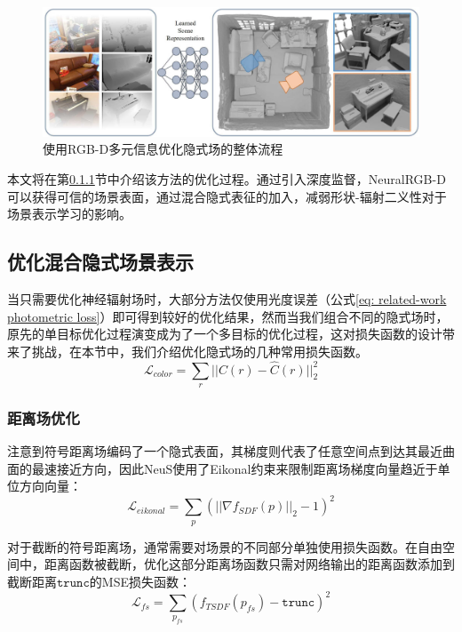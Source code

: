 \begin{figure}[htbp]
    \centering
    \includegraphics[width=\textwidth]{undergraduate-thesis/images/neural-rgbd problem.png}
    \caption{使用RGB-D多元信息优化隐式场的整体流程}
    \label{fig:related-work neural-rgbd formulation}
\end{figure}

本文将在第\ref{sec: related-work SDF optimization}节中介绍该方法的优化过程。通过引入深度监督，NeuralRGB-D可以获得可信的场景表面，通过混合隐式表征的加入，减弱形状-辐射二义性对于场景表示学习的影响。

\subsection{优化混合隐式场景表示}
当只需要优化神经辐射场时，大部分方法仅使用光度误差（公式\ref{eq: related-work photometric loss}）即可得到较好的优化结果，然而当我们组合不同的隐式场时，原先的单目标优化过程演变成为了一个多目标的优化过程，这对损失函数的设计带来了挑战，在本节中，我们介绍优化隐式场的几种常用损失函数。
\begin{equation}
    \mathcal{L}_{color} = \sum_r||C(r)-\hat{C}(r)||_2^2
    \label{eq: related-work photometric loss}
\end{equation}

\subsubsection{距离场优化}
\label{sec: related-work SDF optimization}
注意到符号距离场编码了一个隐式表面，其梯度则代表了任意空间点到达其最近曲面的最速接近方向，因此NeuS\cite{wang_neus_2021}使用了Eikonal约束来限制距离场梯度向量趋近于单位方向向量：
\begin{equation}
    \mathcal{L}_{eikonal} = \sum_p(||\nabla f_{SDF}(p)||_2-1)^2
\end{equation}

对于截断的符号距离场\cite{azinovic_neural_2022}，通常需要对场景的不同部分单独使用损失函数。在自由空间中，距离函数被截断，优化这部分距离场函数只需对网络输出的距离函数添加到截断距离$\mathtt{trunc}$的MSE损失函数：
\begin{equation}
    \mathcal{L}_{fs} = \sum_{p_{fs}}(f_{TSDF}(p_{fs})-\mathtt{trunc})^2
\end{equation}

